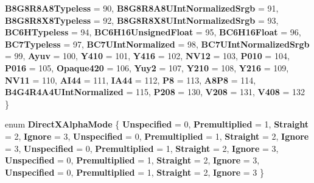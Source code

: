\begin{DoxyCompactItemize}
{\bfseries B8\+G8\+R8\+A8\+Typeless} = 90, 
{\bfseries B8\+G8\+R8\+A8\+U\+Int\+Normalized\+Srgb} = 91, 
\newline
{\bfseries B8\+G8\+R8\+X8\+Typeless} = 92, 
{\bfseries B8\+G8\+R8\+X8\+U\+Int\+Normalized\+Srgb} = 93, 
{\bfseries B\+C6\+H\+Typeless} = 94, 
{\bfseries B\+C6\+H16\+Unsigned\+Float} = 95, 
\newline
{\bfseries B\+C6\+H16\+Float} = 96, 
{\bfseries B\+C7\+Typeless} = 97, 
{\bfseries B\+C7\+U\+Int\+Normalized} = 98, 
{\bfseries B\+C7\+U\+Int\+Normalized\+Srgb} = 99, 
\newline
{\bfseries Ayuv} = 100, 
{\bfseries Y410} = 101, 
{\bfseries Y416} = 102, 
{\bfseries N\+V12} = 103, 
\newline
{\bfseries P010} = 104, 
{\bfseries P016} = 105, 
{\bfseries Opaque420} = 106, 
{\bfseries Yuy2} = 107, 
\newline
{\bfseries Y210} = 108, 
{\bfseries Y216} = 109, 
{\bfseries N\+V11} = 110, 
{\bfseries A\+I44} = 111, 
\newline
{\bfseries I\+A44} = 112, 
{\bfseries P8} = 113, 
{\bfseries A8\+P8} = 114, 
{\bfseries B4\+G4\+R4\+A4\+U\+Int\+Normalized} = 115, 
\newline
{\bfseries P208} = 130, 
{\bfseries V208} = 131, 
{\bfseries V408} = 132
 \}
\item 
\mbox{\label{namespace_windows_1_1_graphics_1_1_direct_x_af123b0bc9a4738d81ccfc0ea3154e8d2}} 
enum {\bfseries Direct\+X\+Alpha\+Mode} \{ \newline
{\bfseries Unspecified} = 0, 
{\bfseries Premultiplied} = 1, 
{\bfseries Straight} = 2, 
{\bfseries Ignore} = 3, 
\newline
{\bfseries Unspecified} = 0, 
{\bfseries Premultiplied} = 1, 
{\bfseries Straight} = 2, 
{\bfseries Ignore} = 3, 
\newline
{\bfseries Unspecified} = 0, 
{\bfseries Premultiplied} = 1, 
{\bfseries Straight} = 2, 
{\bfseries Ignore} = 3, 
\newline
{\bfseries Unspecified} = 0, 
{\bfseries Premultiplied} = 1, 
{\bfseries Straight} = 2, 
{\bfseries Ignore} = 3, 
\newline
{\bfseries Unspecified} = 0, 
{\bfseries Premultiplied} = 1, 
{\bfseries Straight} = 2, 
{\bfseries Ignore} = 3
 \}
\item 
\mbox{\label{namespace_windows_1_1_graphics_1_1_direct_x_a842a48af0a06e5cee12c38f8c99fbdce}} 

\end{DoxyCompactItemize}

